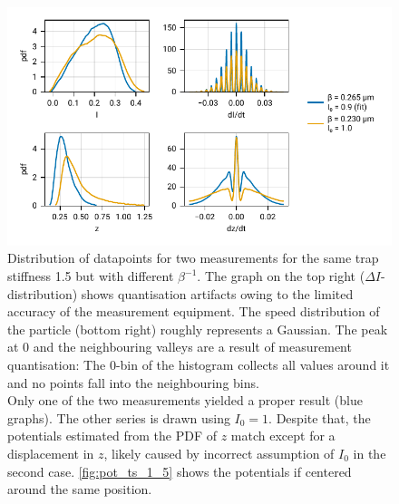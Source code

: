 \documentclass[
    twoside=false,
    twocolumn=true,
    fontsize=11pt,
]{scrarticle}
\begin{document}
\begin{figure}
    \centering
    \includegraphics{figures/02_04_02_hist.pdf}
    \caption{Distribution of datapoints for two measurements for the same trap stiffness \SI{1.5}{} but with different $\beta^{-1}$. The graph on the top right ($\Delta I$-distribution) shows quantisation artifacts owing to the limited accuracy of the measurement equipment. The speed distribution of the particle (bottom right) roughly represents a Gaussian. The peak at $0$ and the neighbouring valleys are a result of measurement quantisation: The $0$-bin of the histogram collects all values around it and no points fall into the neighbouring bins.\\
    Only one of the two measurements yielded a proper result (blue graphs). The other series is drawn using $I_0 = 1$. Despite that, the potentials estimated from the PDF of $z$ match except for a displacement in $z$, likely caused by incorrect assumption of $I_0$ in the second case. \autoref{fig:pot_ts_1_5} shows the potentials if centered around the same position.}
    \label{fig:pdf_ts_1_5}
\end{figure}
\end{document}
